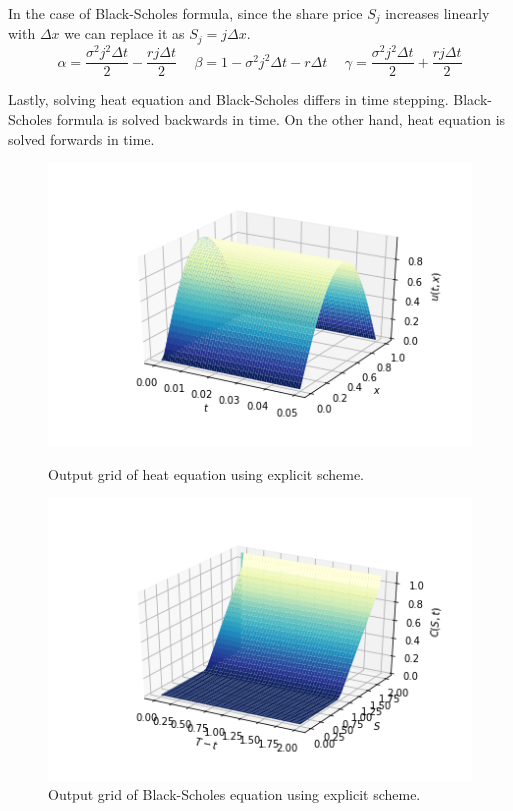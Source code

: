\documentclass[12pt, oneside]{book}
\theoremstyle{plain}
\theoremstyle{definition}
\begin{document}
In the case of Black-Scholes formula, since the share price $S_j$ increases linearly with $\Delta x$ we can replace it as $S_j = j \Delta x$. 
\begin{equation}
\alpha =  \frac{\sigma^2 j^2 \Delta t}{2} - \frac{r j \Delta t}{2} \hspace{15pt} 
\beta = 1 - \sigma^2 j^2 \Delta t - r \Delta t \hspace{15pt} 
\gamma = \frac{\sigma^2 j^2 \Delta t}{2} + \frac{r j \Delta t}{2}
\end{equation}

Lastly, solving heat equation and Black-Scholes differs in time stepping. Black-Scholes formula is solved backwards in time. On the other hand, heat equation is solved forwards in time. 



\begin{figure}[!htb]
  \begin{minipage}[b]{0.5\textwidth}
    \includegraphics[width=\textwidth]{HeatExplicitGrid.png}
    \caption{Output grid of heat equation using explicit scheme.}
  \end{minipage}
  \begin{minipage}[b]{0.5\textwidth}
    \includegraphics[width=\textwidth]{BSExplicitGrid.png}
    \caption{Output grid of Black-Scholes equation using explicit scheme.}
  \end{minipage}
\end{figure}
\end{document}
